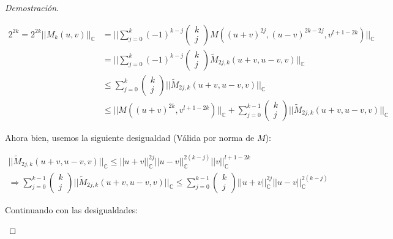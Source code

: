 \begin{proof}[Demostración]
\begin{enumerate}
		
		\begin{align*}
			2^{2k} = 2^{2k}||M_k(u,v)||_{\mathbb{C}} &=
			||\sum_{j = 0}^k (-1)^{k-j} \begin{pmatrix}
				k\\
				j
			\end{pmatrix} M((u+v)^{2j},(u-v)^{2k-2j},v^{l+1-2k})||_{\mathbb{C}} \\
			&=
			||\sum_{j = 0}^k (-1)^{k-j} \begin{pmatrix}
				k\\
				j
			\end{pmatrix} \tilde{M}_{2j,k}(u+v,u-v,v)||_{\mathbb{C}} \\
			&\leq \sum_{j = 0}^k \begin{pmatrix}
				k\\
				j
			\end{pmatrix} ||\tilde{M}_{2j,k}(u+v,u-v,v)||_{\mathbb{C}} \\
			&\leq ||M((u+v)^{2k},v^{l+1-2k})||_{\mathbb{C}}+\sum_{j = 0}^{k-1}\begin{pmatrix}
				k\\
				j
			\end{pmatrix} ||\tilde{M}_{2j,k}(u+v,u-v,v)||_{\mathbb{C}}
		\end{align*}
		
		Ahora bien, usemos la siguiente desigualdad (Válida por norma de $M$):
		
		\begin{align*}
			||\tilde{M}_{2j,k}(u+v,u-v,v)||_{\mathbb{C}}\leq ||u+v||_{\mathbb{C}}^{2j} ||u-v||_{\mathbb{C}}^{2(k-j)}||v||_{\mathbb{C}}^{l+1-2k} \\
			\Rightarrow  \sum_{j = 0}^{k-1}\begin{pmatrix}
				k\\
				j
			\end{pmatrix} ||\tilde{M}_{2j,k}(u+v,u-v,v)||_{\mathbb{C}} \leq \sum_{j = 0}^{k-1}\begin{pmatrix}
				k\\
				j
			\end{pmatrix} ||u+v||_{\mathbb{C}}^{2j} ||u-v||_{\mathbb{C}}^{2(k-j)}
		\end{align*}
		
		Continuando con las desigualdades:
		

\end{enumerate}
\end{proof}

